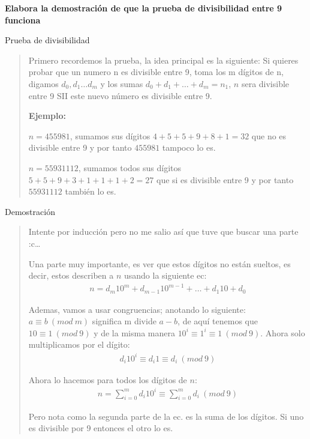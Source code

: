 \textbf{Elabora la demostración de que la prueba de divisibilidad entre 9 funciona}\vspace{.2cm}

\textcolor{bibi}{Prueba de divisibilidad}
\begin{quote}
    Primero recordemos la prueba, la idea principal es la siguiente: Si quieres probar que un
    numero n es divisible entre 9, toma los m dígitos de n, digamos $d_0,d_1 \dots d_m$ y los
    sumas $d_0+d_1 +\dots+ d_m=n_1$, $n$ sera divisible entre 9 SII este nuevo número es
    divisible entre 9. \vspace{.3cm}

    \textbf{Ejemplo:}

    $n=455981$, sumamos sus dígitos $4+5+5+9+8+1=32$ que no es divisible entre 9 y por tanto
    $455981$ tampoco lo es. \vspace{.3cm}

    $n=55931112$, sumamos todos sus dígitos $5+5+9+3+1+1+1+2=27$ que si es divisible entre 9 y
    por tanto $55931112$ también lo es.
\end{quote}

\textcolor{bibi}{Demostración}
\begin{quote}
    Intente por inducción pero no me salio así que tuve que buscar una parte :c\dots

    Una parte muy importante, es ver que estos dígitos no están sueltos, es decir, estos
    describen a $n$ usando la siguiente ec:
    \begin{align*}
        n=d_m 10^m + d_{m-1} 10^{m-1} + \dots + d_1 10 + d_0 
    \end{align*}

    Ademas, vamos a usar congruencias; anotando lo siguiente: $a \equiv b \ (mod \ m)$ significa
    m divide $a-b$, de aquí tenemos que $10 \equiv 1 \ (mod \ 9)$ y de la misma manera $10^i
    \equiv 1^i \equiv 1 \ (mod \ 9)$. Ahora solo multiplicamos por el dígito:
    \begin{align*}
        d_i 10^i \equiv d_i 1 \equiv d_i \ (mod \ 9)
    \end{align*}

    Ahora lo hacemos para todos los dígitos de $n$:
    \begin{align*}
        n = \displaystyle\sum_{i=0}^{m} d_i 10^i \equiv \displaystyle\sum_{i=0}^{m} d_i \
        (mod \ 9)
    \end{align*}

    Pero nota como la segunda parte de la ec. es la suma de los dígitos. Si uno es divisible
    por 9 entonces el otro lo es. 
\end{quote}
